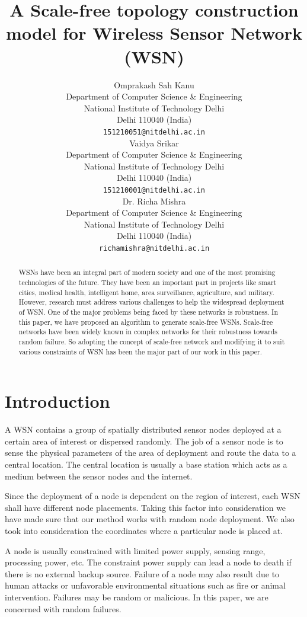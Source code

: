 \documentclass{article}
\title{A Scale-free topology construction model for Wireless Sensor Network (WSN)}
\author{
	Omprakash Sah Kanu \\
	Department of Computer Science \& Engineering\\
	National Institute of Technology Delhi \\
	Delhi 110040 (India)\\
	\texttt{151210051@nitdelhi.ac.in} \\
	\And
	Vaidya Srikar \\
	Department of Computer Science \& Engineering\\
	National Institute of Technology Delhi \\
	Delhi 110040 (India)\\
	\texttt{151210001@nitdelhi.ac.in} \\
	\And
	Dr. Richa Mishra\\
	Department of Computer Science \& Engineering\\
	National Institute of Technology Delhi \\
	Delhi 110040 (India)\\
	\texttt{richamishra@nitdelhi.ac.in} \\
}
\begin{document}
	\maketitle
	
	\begin{abstract}
		WSNs have been an integral part of modern society and one of the most promising technologies of the future. They have been an important part in projects like smart cities, medical health, intelligent home, area surveillance, agriculture, and military. However, research must address various challenges to help the widespread deployment of WSN. One of the major problems being faced by these networks is robustness. In this paper, we have proposed an algorithm to generate scale-free WSNs. Scale-free networks have been widely known in complex networks for their robustness towards random failure. So adopting the concept of scale-free network and modifying it to suit various constraints of WSN has been the major part of our work in this paper. 
	\end{abstract}
	
	
	
	
	\section{Introduction}
	A WSN contains a group of spatially distributed sensor nodes deployed at a certain area of interest or dispersed randomly. The job of a sensor node is to sense the physical parameters of the area of deployment and route the data to a central location. The central location is usually a base station which acts as a medium between the sensor nodes and the internet. 
	
	Since the deployment of a node is dependent on the region of interest, each WSN shall have different node placements. Taking this factor into consideration we have made sure that our method works with random node deployment. We also took into consideration the coordinates where a particular node is placed at.    
	
	A node is usually constrained with limited power supply, sensing range, processing power, etc. The constraint power supply can lead a node to death if there is no external backup source. Failure of a node may also result due to human attacks or unfavorable environmental situations such as fire or animal intervention. Failures may be random or malicious. In this paper, we are concerned with random failures.
	
\end{document}
